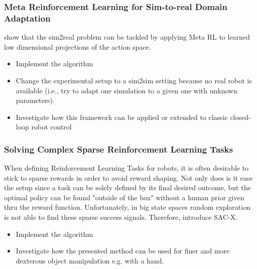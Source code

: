 \documentclass[a4paper]{article}
\begin{document}
\subsubsection{Meta Reinforcement Learning for Sim-to-real Domain Adaptation}
\cite{Arndt19} show that the sim2real problem can be tackled by applying Meta RL to learned low dimensional projections of the action space.
\begin{itemize}
\item Implement the algorithm 
\item Change the experimental setup to a sim2sim setting because no real robot is available (i.e., try to adapt one simulation to a given one with unknown parameters).
\item Investigate how this framework can be applied or extended to classic closed-loop robot control
\end{itemize}

\subsubsection{Solving Complex Sparse Reinforcement Learning Tasks}
When defining Reinforcement Learning Tasks for robots, it is often desirable to stick to sparse rewards in order to avoid reward shaping. Not only does is it ease the setup since a task can be solely defined by its final desired outcome, but the optimal policy can be found "outside of the box" without a human prior given thru the reward function. Unfortunately,  in big state spaces random exploration is not able to find these sparse success signals. Therefore, \cite{riedmiller2018} introduce SAC-X.
\begin{itemize}
\item Implement the algorithm
\item Investigate how the presented method can be used for finer and more dexterous object manipulation e.g. with a hand.
\end{itemize}




\end{document}
